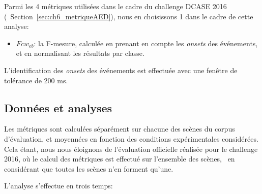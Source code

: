 Parmi les 4 métriques utilisées dans le cadre du challenge DCASE 2016 (\cf~Section~\ref{sec:ch6_metriqueAED}), nous en choisissons 1 dans le cadre de cette analyse:

\begin{itemize}
\item $Fcw_{eb}$: la F-mesure, calculée en prenant en compte les \emph{onsets} des événements, et en normalisant les résultats par classe.
\end{itemize}

L'identification des \emph{onsets} des événements est effectuée avec une fenêtre de tolérance de 200 ms.

\subsection{Données et analyses}

Les métriques sont calculées séparément sur chacune des scènes du corpus d'évaluation, et moyennées en fonction des conditions expérimentales considérées. Cela étant, nous nous éloignons de l'évaluation officielle réalisée pour le challenge 2016, où le calcul des métriques est effectué sur l'ensemble des scènes, \ie~en considérant que toutes les scènes n'en forment qu'une.

L'analyse s'effectue en trois temps:

